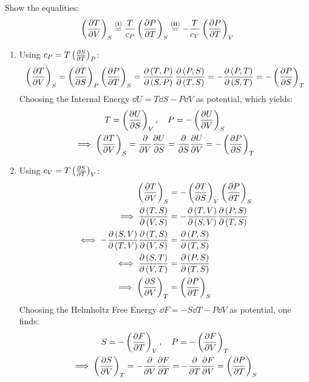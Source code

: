 \documentclass[11pt,a4paper]{scrartcl}
\newcommand{\blip}[1]{\mathrm{\bold{(#1)}}}
\newcommand{\thermpart}[3]{\left(\pdv{#1}{#2}\right)_{#3}}
\newcommand{\jactwo}[4]{\pdv{\left(#1,#2\right)}{\left(#3,#4\right)}}
\newcommand{\cV}{\ensuremath{c_V}}
\newcommand{\cP}{\ensuremath{c_P}}
\begin{document}
\section{}

Show the equalities:
\begin{equation*}
    \thermpart{T}{V}{S}\overset{\blip{i}}{=}\frac{T}{\cP}\thermpart{P}{T}{S}\overset{\blip{ii}}{=}-\frac{T}{\cV}\thermpart{P}{T}{V}
\end{equation*}

\begin{enumerate}[label=\textbf{(\roman*)}]
    \item Using $\cP=T\thermpart{S}{T}{P}$:
        \begin{equation*}
            \thermpart{T}{V}{S}=\thermpart{T}{S}{P}\thermpart{P}{T}{S}
            =\jactwo{T}{P}{S}{P}\,\jactwo{P}{S}{T}{S}=-\jactwo{P}{T}{S}{T}
            =-\thermpart{P}{S}{T}
        \end{equation*}
        Choosing the Internal Energy $\dd U=T\dd S-P\dd V$ as potential, which yields:
        \begin{gather*}
            T=\thermpart{U}{S}{V}\qc P=-\thermpart{U}{V}{S} \\
            \implies\thermpart{T}{V}{S}=\pdv{V}\pdv{U}{S}=\pdv{S}\pdv{U}{V}=-\thermpart{P}{S}{T}
        \end{gather*}

    \item Using $\cV=T\thermpart{S}{T}{V}$:
        \begin{align*}
            \thermpart{T}{V}{S}&=-\thermpart{T}{S}{V}\thermpart{P}{T}{S} \\
            \implies\jactwo{T}{S}{V}{S}&=-\jactwo{T}{V}{S}{V}\jactwo{P}{S}{T}{S} \\
            \iff-\jactwo{S}{V}{T}{V}\jactwo{T}{S}{V}{S}&=\jactwo{P}{S}{T}{S} \\
            \iff\jactwo{S}{T}{V}{T}&=\jactwo{P}{S}{T}{S} \\
            \implies\thermpart{S}{V}{T}&=\thermpart{P}{T}{S}
        \end{align*}
        Choosing the Helmholtz Free Energy $\dd F=-S\dd T-P\dd V$ as potential, one finds:
        \begin{gather*}
            S=-\thermpart{F}{T}{V}\qc P=-\thermpart{F}{V}{T}\\
            \implies \thermpart{S}{V}{T}=-\pdv{V}\pdv{F}{T}=-\pdv{T}\pdv{F}{V}=\thermpart{P}{T}{S}
        \end{gather*}
\end{enumerate}
\end{document}
